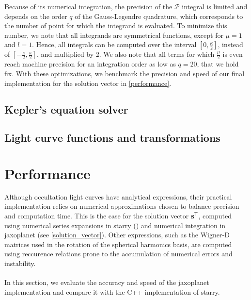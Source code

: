 \documentclass[modern]{aastex631}
\begin{document}
Because of its numerical integration, the precision of the $\mathcal{P}$ integral is limited and depends on the order $q$ of the Gauss-Legendre quadrature, which corresponds to the number of point for which the integrand is evaluated. To minimize this number, we note that all integrands are symmetrical functions, except for $\mu=1$ and $l=1$. Hence, all integrals can be computed over the interval $\left[0, \frac{\kappa}{2}\right]$, instead of $\left[-\frac{\kappa}{2}, \frac{\kappa}{2}\right]$, and multiplied by 2. We also note that all terms for which $\frac{\mu}{2}$ is even reach machine precision for an integration order as low as $q=20$, that we hold fix. With these optimizations, we benchmark the precision and speed of our final implementation for the solution vector in \autoref{performance}.

\subsection{Kepler's equation solver}
\todo{}
\subsection{Light curve functions and transformations}
\todo{}

\section{Performance}\label{performance}
Although occultation light curves have analytical expressions, their practical implementation relies on numerical approximations chosen to balance precision and computation time. This is the case for the solution vector ${\mathbf{s}}^\mathsf{T}$, computed using numerical series expansions in \textsf{starry} (\citealt[section D.2.3]{starry}) and numerical integration in \textsf{jaxoplanet} (see \autoref{solution_vector}). Other expressions, such as the Wigner-D matrices used in the rotation of the spherical harmonics basis, are computed using reccurence relations prone to the accumulation of numerical errors and instability.\\\\
In this section, we evaluate the accuracy and speed of the \textsf{jaxoplanet} implementation and compare it with the C++ implementation of \textsf{starry}.
\end{document}
